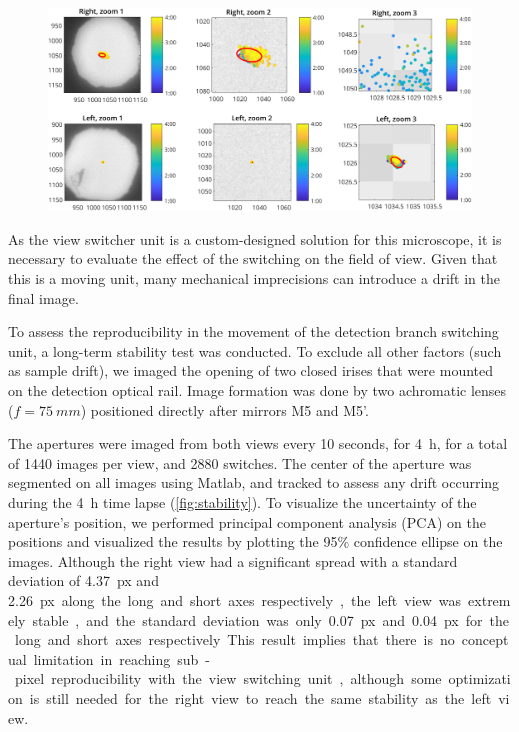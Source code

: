     \begin{figure}
      \centering
      \includegraphics[width=\textwidth]{trackCenter}
      \label{fig:stability}
    \end{figure}

    As the view switcher unit is a custom-designed solution for this microscope, it is necessary to evaluate the effect of the switching on the field of view. Given that this is a moving unit, many mechanical imprecisions can introduce a drift in the final image. 

    To assess the reproducibility in the movement of the detection branch switching unit, a long-term stability test was conducted. To exclude all other factors (such as sample drift), we imaged the opening of two closed irises that were mounted on the detection optical rail. Image formation was done by two achromatic lenses ($f=\SI{75}{mm}$) positioned directly after mirrors M5 and M5'.
    
    The apertures were imaged from both views every 10 seconds, for \SI{4}{h}, for a total of 1440 images per view, and 2880 switches. The center of the aperture was segmented on all images using Matlab, and tracked to assess any drift occurring during the \SI{4}{h} time lapse (\autoref{fig:stability}). To visualize the uncertainty of the aperture's position, we performed principal component analysis (PCA) on the positions and visualized the results by plotting the 95\% confidence ellipse on the images. Although the right view had a significant spread with a standard deviation of \SI{4.37}{px} and \SI{2.26}px along the long and short axes respectively, the left view was extremely stable, and the standard deviation was only \SI{0.07}{px} and \SI{0.04}{px} for the long and short axes respectively. This result implies that there is no conceptual limitation in reaching sub-pixel reproducibility with the view switching unit, although some optimization is still needed for the right view to reach the same stability as the left view. 

